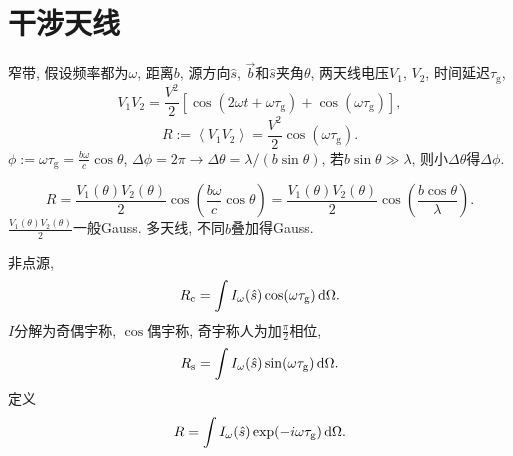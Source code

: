 \chapter{干涉天线}

窄带, 假设频率都为$\omega$, 距离$b$, 源方向$\hat{s}$, $\vec{b}$和$\hat{s}$夹角$\theta$, 两天线电压$V_1$, $V_2$, 时间延迟$\tau_\text{g}$,
\begin{equation}
    V_1V_2=\frac{V^2}{2}\left[\cos(2\omega t+\omega\tau_\text{g})+\cos(\omega\tau_\text{g})\right],
\end{equation}
\begin{equation}
    R:=\left\langle V_1V_2\right\rangle =\frac{V^2}{2}\cos(\omega\tau_\text{g}).
\end{equation}
$\phi:=\omega\tau_\text{g}=\frac{b\omega}{c}\cos\theta$, $\Delta\phi=2\pi\to\Delta\theta=\lambda/(b\sin\theta)$, 若$b\sin\theta\gg\lambda$, 则小$\Delta\theta$得$\Delta\phi$.

\begin{equation}
    R=\frac{V_1(\theta)V_2(\theta)}{2}\cos\left(\frac{b\omega}{c}\cos\theta\right)=\frac{V_1(\theta)V_2(\theta)}{2}\cos\left(\frac{b\cos\theta}{\lambda}\right).
\end{equation}
$\frac{V_1(\theta)V_2(\theta)}{2}$一般Gauss. 多天线, 不同$b$叠加得Gauss.

非点源,
\begin{equation}
    R_\text{c}=\int I_\omega(\hat{s})\cos(\omega\tau_\text{g})\,\mathrm{d}\Omega.
\end{equation}
$I$分解为奇偶宇称, $\cos$偶宇称, 奇宇称人为加$\frac{\pi}{2}$相位,
\begin{equation}
    R_\text{s}=\int I_\omega(\hat{s})\sin(\omega\tau_\text{g})\,\mathrm{d}\Omega.
\end{equation}
定义
\begin{equation}
    R=\int I_\omega(\hat{s})\exp(-i\omega\tau_\text{g})\,\mathrm{d}\Omega.
\end{equation}
